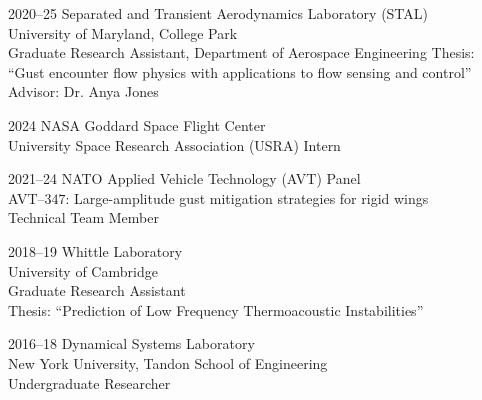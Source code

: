 \documentclass[12pt,letterpaper]{report}
\newcommand{\listitemspace}{0.25em}
\renewenvironment{itemize}
{\begin{list}{}{\setlength{\leftmargin}{0em}
                \setlength{\parskip}{0em}
                \setlength{\itemsep}{\listitemspace}
                \setlength{\parsep}{\listitemspace}}}
{\end{list}}
\begin{document}
    \begin{tablist}

     \item[2020--25]   \tab{}Separated and Transient Aerodynamics Laboratory (STAL) \\ 
        University of Maryland, College Park \\ 
        Graduate Research Assistant, Department of Aerospace Engineering 
        \tab{}Thesis: \enquote{Gust encounter flow physics with applications to flow sensing and control}
        \tab{}Advisor: Dr. Anya Jones\\
  

        \item[2024]   \tab{}NASA Goddard Space Flight Center \\ 
        University Space Research Association (USRA) Intern \\
                

    \item[2021--24]   \tab{}NATO Applied Vehicle Technology (AVT) Panel \\ 
    AVT--$347$: Large-amplitude gust mitigation strategies for rigid wings \\
    Technical Team Member \\
		 


        \item[2018--19] \tab{}Whittle Laboratory \\ 
        University of Cambridge \\ 
        Graduate Research Assistant \\

		Thesis: \enquote{Prediction of Low Frequency Thermoacoustic Instabilities} \\

        \item[2016--18] \tab{}Dynamical Systems Laboratory \\ 
        New York University, Tandon School of Engineering \\ 
        Undergraduate Researcher \\
    \end{tablist}


%
%
%
\end{document}
